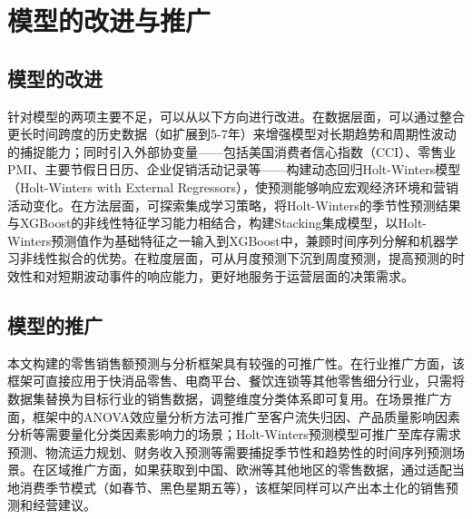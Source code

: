 

\section{模型的改进与推广}

\subsection{模型的改进}

针对模型的两项主要不足，可以从以下方向进行改进。在数据层面，可以通过整合更长时间跨度的历史数据（如扩展到5-7年）来增强模型对长期趋势和周期性波动的捕捉能力；同时引入外部协变量——包括美国消费者信心指数（CCI）、零售业PMI、主要节假日日历、企业促销活动记录等——构建动态回归Holt-Winters模型（Holt-Winters with External Regressors），使预测能够响应宏观经济环境和营销活动变化。在方法层面，可探索集成学习策略，将Holt-Winters的季节性预测结果与XGBoost的非线性特征学习能力相结合，构建Stacking集成模型，以Holt-Winters预测值作为基础特征之一输入到XGBoost中，兼顾时间序列分解和机器学习非线性拟合的优势。在粒度层面，可从月度预测下沉到周度预测，提高预测的时效性和对短期波动事件的响应能力，更好地服务于运营层面的决策需求。

\subsection{模型的推广}

本文构建的零售销售额预测与分析框架具有较强的可推广性。在行业推广方面，该框架可直接应用于快消品零售、电商平台、餐饮连锁等其他零售细分行业，只需将数据集替换为目标行业的销售数据，调整维度分类体系即可复用。在场景推广方面，框架中的ANOVA效应量分析方法可推广至客户流失归因、产品质量影响因素分析等需要量化分类因素影响力的场景；Holt-Winters预测模型可推广至库存需求预测、物流运力规划、财务收入预测等需要捕捉季节性和趋势性的时间序列预测场景。在区域推广方面，如果获取到中国、欧洲等其他地区的零售数据，通过适配当地消费季节模式（如春节、黑色星期五等），该框架同样可以产出本土化的销售预测和经营建议。
